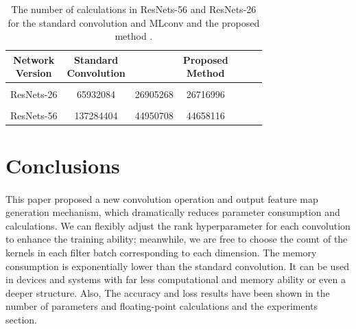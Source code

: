 \documentclass{report}
\begin{document}
\newpage

\begin{table}
	\begin{center}
		\caption{
		The number of calculations in 
		ResNets-56
		and 
		ResNets-26
		for the standard convolution and 
		MLconv 
		and the proposed method
		.
		}
		\label{t3}
		\begin{tabular}{c|c|c|c|c|c|c}
			\thead{
				Network\\ Version }&  
			\thead {
				Standard\\
				Convolution}
			&
			\thead {
				MLconv}
			&
			\thead {Proposed \\Method}
			
			\\
			\hline &&& \\
            ResNets-26 &  65932084  &  26905268 &  26716996\\&&&\\
			ResNets-56 & 137284404 &    44950708 & 44658116
			
			
		\end{tabular}
		
	\end{center}
\end{table}















\section{Conclusions}

\paragraph*{}
This paper proposed a new convolution operation and output feature map generation mechanism, which dramatically reduces parameter consumption and calculations. We can flexibly adjust the rank hyperparameter for each convolution to enhance the training ability; meanwhile, we are free to choose the count of the kernels in each filter batch corresponding to each dimension. The memory consumption is exponentially lower than the standard convolution. It can be used in devices and systems with far less computational and memory ability or even a deeper structure. Also, The accuracy and loss results have been shown in the number of parameters and floating-point calculations and the experiments section.
\end{document}
